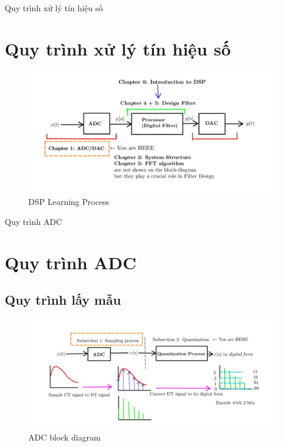 \documentclass[8pt]{beamer}
\begin{document}
\begin{frame}{Quy trình xử lý tín hiệu số}
\section{Quy trình xử lý tín hiệu số}
\begin{figure}[h]
			\includegraphics[width=1.1\textwidth]{1.jpg}
			\caption{DSP Learning Process}			\label{fig:re2}
		\end{figure}

\end{frame}
\begin{frame}{Quy trình ADC}
\section{Quy trình ADC}
\subsection{Quy trình lấy mẫu}
\begin{figure}[h]
			\includegraphics[width=1.1\textwidth]{2.jpg}
			\caption{ADC block diagram}			\label{fig:re3}
		\end{figure}


\end{frame}
\end{document}

